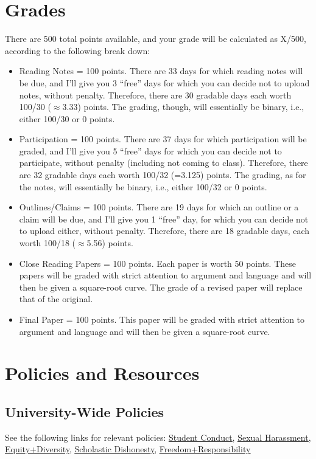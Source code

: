 \documentclass[12pt]{article}
\begin{document}
\section{Grades}
There are 500 total points available, and your grade will be calculated as X/500, according to the following break down:
\begin{itemize}
    \item Reading Notes = 100 points. There are 33 days for which reading notes will be due, and I'll give you 3 ``free'' days for which you can decide not to upload notes, without penalty. Therefore, there are 30 gradable days each worth 100/30 ($\approx$3.33) points. The grading, though, will essentially be binary, i.e., either 100/30 or 0 points.
    \item Participation = 100 points. There are 37 days for which participation will be graded, and I'll give you 5 ``free'' days for which you can decide not to participate, without penalty (including not coming to class). Therefore, there are 32 gradable days each worth 100/32 (=3.125) points. The grading, as for the notes, will essentially be binary, i.e., either 100/32 or 0 points.
    \item Outlines/Claims = 100 points. There are 19 days for which an outline or a claim will be due, and I'll give you 1 ``free'' day, for which you can decide not to upload either, without penalty. Therefore, there are 18 gradable days, each worth 100/18 ($\approx$5.56) points.
    \item Close Reading Papers = 100 points. Each paper is worth 50 points. These papers will be graded with strict attention to argument and language and will then be given a square-root curve. The grade of a revised paper will replace that of the original.
    \item Final Paper = 100 points. This paper will be graded with strict attention to argument and language and will then be given a square-root curve.
\end{itemize}

\section{Policies and Resources}
\subsection{University-Wide Policies}
See the following links for relevant policies: \href{http://regents.umn.edu/sites/regents.umn.edu/files/policies/Student_Conduct_Code.pdf}{\underline{Student Conduct}}, \href{https://regents.umn.edu/sites/regents.umn.edu/files/policies/Sexual_Harassment_Sexual_Assault_Stalking_Relationship_Violence.pdf}{\underline{Sexual Harassment}}, \href{http://regents.umn.edu/sites/regents.umn.edu/files/policies/Equity_Diversity_EO_AA.pdf}{\underline{Equity+Diversity}}, \href{https://communitystandards.umn.edu/avoid-violations/avoiding-scholastic-dishonesty}{\underline{Scholastic Dishonesty}}, \href{https://regents.umn.edu/sites/regents.umn.edu/files/policies/Academic_Freedom.pdf}{\underline{Freedom+Responsibility}}
\end{document}
